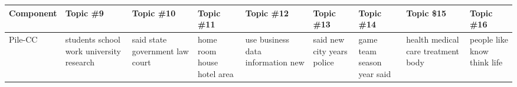 \documentclass[11pt,a4paper]{article}
\begin{document}
\begin{appendices}
\begin{table}[htb]
\centering
\vspace{-1.5cm}
\begin{tiny}
\begin{tabular}{|p{}|p{}|p{}|p{}|p{}|p{}|p{}|p{}|p{}|}
\hline
Component & Topic \#9 & Topic \#10 & Topic \#11 & Topic \#12 & Topic \#13 & Topic \#14 & Topic \$15 & Topic \#16\\\hline
Pile-CC & students \newline school \newline work \newline university \newline research & said \newline state \newline government \newline law \newline court & home \newline room \newline house \newline hotel \newline area & use \newline business \newline data \newline information \newline new & said \newline new \newline city \newline years \newline police & game \newline team \newline season \newline year \newline said & health \newline medical \newline care \newline treatment \newline body & people \newline like \newline know \newline think \newline life\\\hline

\end{tabular}
\end{tiny}
\end{table}
\end{appendices}
\end{document}
